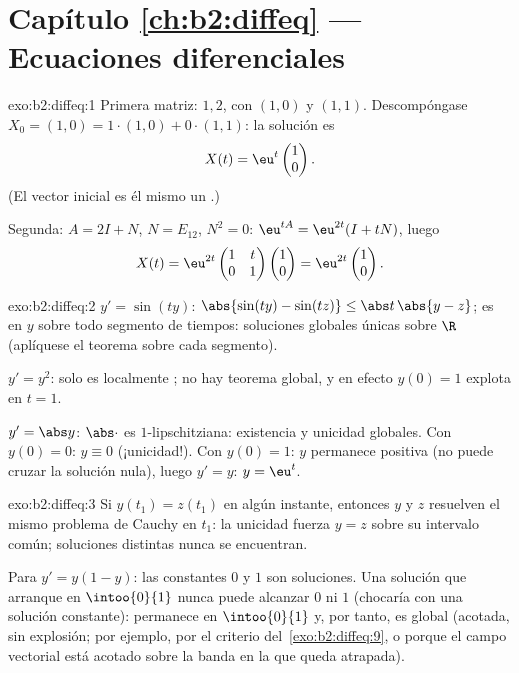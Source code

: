 \section*{Capítulo \ref{ch:b2:diffeq} --- Ecuaciones diferenciales}

\begin{solution}{exo:b2:diffeq:1}
Primera matriz:  $1, 2$, con 
$(1,0)$ y $(1,1)$. Descompóngase $X_0 = (1,0) = 1\cdot(1,0) +
0\cdot(1,1)$: la solución es
\[
X(t) = \eu^{t}\begin{pmatrix}1\\ 0\end{pmatrix} .
\]
(El vector inicial es él mismo un .)

Segunda: $A = 2I + N$, $N = E_{12}$, $N^2 = 0$: $\eu^{tA} =
\eu^{2t}(I + tN)$, luego
\[
X(t) = \eu^{2t}\begin{pmatrix} 1 & t\\ 0 & 1\end{pmatrix}
\begin{pmatrix}1\\ 0\end{pmatrix}
= \eu^{2t}\begin{pmatrix}1\\ 0\end{pmatrix}.
\]
\end{solution}

\begin{solution}{exo:b2:diffeq:2}
$y' = \sin(ty)$: $\abs{\sin(ty) - \sin(tz)} \leq \abs t\,\abs{y -
z}$; es  en $y$  sobre todo segmento de
tiempos: soluciones globales únicas sobre $\R$ (aplíquese el teorema
sobre cada segmento).

$y' = y^2$: solo es localmente ; no hay teorema global, y
en efecto $y(0) = 1$ explota en $t = 1$.

$y' = \abs y$: $\abs\cdot$ es $1$-lipschitziana: existencia y unicidad
globales. Con $y(0) = 0$: $y \equiv 0$ (¡unicidad!). Con $y(0) = 1$:
$y$ permanece positiva (no puede cruzar la solución nula), luego $y' =
y$: $y = \eu^t$.
\end{solution}

\begin{solution}{exo:b2:diffeq:3}
Si $y(t_1) = z(t_1)$ en algún instante, entonces $y$ y $z$ resuelven
el mismo problema de Cauchy en $t_1$: la unicidad fuerza $y = z$
sobre su intervalo común; soluciones distintas nunca se encuentran.

Para $y' = y(1-y)$: las constantes $0$ y $1$ son soluciones. Una
solución que arranque en $\intoo{0}{1}$ nunca puede alcanzar $0$ ni
$1$ (chocaría con una solución constante): permanece en
$\intoo{0}{1}$ y, por tanto, es global (acotada, sin explosión; por
ejemplo, por el criterio del~\cref{exo:b2:diffeq:9}, o porque el
campo vectorial está acotado sobre la banda en la que queda
atrapada).
\end{solution}

